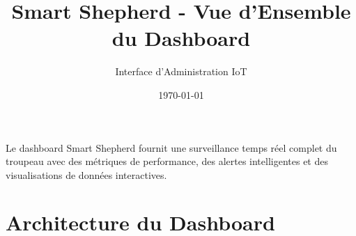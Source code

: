 \documentclass[a4paper,12pt]{article}
\title{\textbf{Smart Shepherd - Vue d'Ensemble du Dashboard}}
\author{Interface d'Administration IoT}
\date{\today}
\begin{document}
\maketitle

\begin{tcolorbox}[colback=primaryblue!10, colframe=primaryblue, title={\faIcon{tachometer-alt} \textbf{Tableau de Bord Intelligent}}]
Le dashboard Smart Shepherd fournit une surveillance temps réel complet du troupeau avec des métriques de performance, des alertes intelligentes et des visualisations de données interactives.
\end{tcolorbox}

\section{Architecture du Dashboard}
\end{document}
